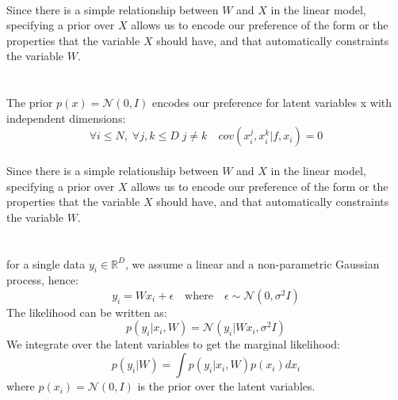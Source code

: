 \documentclass[a4paper,11pt]{article}
\theoremstyle{mytheor}
\begin{document}
\smallskip
\\Since there is a simple relationship between $W$ and $X$ in the linear model, specifying a prior over $X$ allows us to encode our preference of the form or the properties that the variable $X$ should have, and that automatically constraints the variable $W$.
\\\\
\smallskip
{}
\smallskip
\\The prior $p(x) = \mathcal{N}(0,I)$ encodes our preference for latent variables x with independent dimensions: 
\begin{equation*}
\forall i \leq N , \; \forall j,k\leq D \;j \neq k  \quad cov(x_i^j, x^k_{i} | f, x_i ) = 0
\end{equation*}
\smallskip
\\Since there is a simple relationship between $W$ and $X$ in the linear model, specifying a prior over $X$ allows us to encode our preference of the form or the properties that the variable $X$ should have, and that automatically constraints the variable $W$.
\\\\
\smallskip
{}
\smallskip
\\for a single data $y_i \in \mathbb{R}^D$, we assume a linear and a non-parametric Gaussian process, hence:
\begin{equation*}
y_i = W x_i + \epsilon \quad \text{where}\quad \epsilon \sim \mathcal{N}(0, \sigma^2I)  
\end{equation*}
The likelihood can be written as:
\begin{equation*}
p(y_i|x_i, W) = \mathcal{N}(y_i|W x_i, \sigma^2 I)
\end{equation*}
We integrate over the latent variables to get the marginal likelihood:
\begin{equation*}
p(y_i|W) = \int p(y_i|x_i, W)p(x_i)dx_i
\end{equation*}
where $p(x_i) = \mathcal{N}(0,I)$ is the prior over the latent variables.\\
\end{document}
